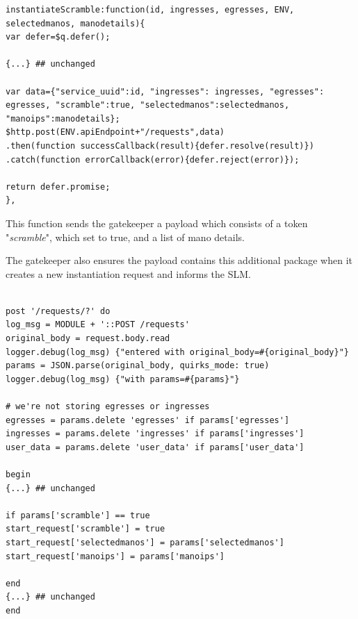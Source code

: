 \begin{lstlisting}[caption=BSS instantiateScramble function, label=lis:BSSscramble]
instantiateScramble:function(id, ingresses, egresses, ENV, selectedmanos, manodetails){				
var defer=$q.defer();

{...} ## unchanged

var data={"service_uuid":id, "ingresses": ingresses, "egresses": egresses, "scramble":true, "selectedmanos":selectedmanos, "manoips":manodetails};
$http.post(ENV.apiEndpoint+"/requests",data)
.then(function successCallback(result){defer.resolve(result)})
.catch(function errorCallback(error){defer.reject(error)});

return defer.promise;
},

\end{lstlisting}

This function sends the gatekeeper a payload which consists of a token "\textit{scramble}", which set to true, and a list of mano details.

The gatekeeper also ensures the payload contains this additional package when it creates a new instantiation request and informs the SLM. 

\begin{lstlisting}[caption=create instantiation request in gatekeeper(request.rb), label=lis:request.rb]

post '/requests/?' do
log_msg = MODULE + '::POST /requests'
original_body = request.body.read
logger.debug(log_msg) {"entered with original_body=#{original_body}"}
params = JSON.parse(original_body, quirks_mode: true)
logger.debug(log_msg) {"with params=#{params}"}

# we're not storing egresses or ingresses
egresses = params.delete 'egresses' if params['egresses']
ingresses = params.delete 'ingresses' if params['ingresses']
user_data = params.delete 'user_data' if params['user_data']

begin
{...} ## unchanged

if params['scramble'] == true
start_request['scramble'] = true 
start_request['selectedmanos'] = params['selectedmanos']
start_request['manoips'] = params['manoips']

end
{...} ## unchanged
end

\end{lstlisting}

